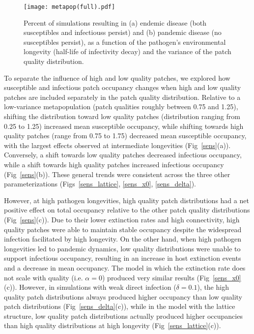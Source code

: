 \documentclass{svjour3}
\begin{document}
\begin{figure}
\centering
\texttt{[image: metapop(full).pdf]}
\caption{Percent of simulations resulting in (a) endemic disease (both susceptibles and infectiouss persist) and (b) pandemic disease (no susceptibles persist), as a function of the pathogen's environmental longevity (half-life of infectivity decay) and the variance of the patch quality distribution.}
\label{poutcome}
\end{figure}   

To separate the influence of high and low quality patches, we explored how susceptible and infectious patch occupancy changes when high and low quality patches are included separately in the patch quality distribution.  Relative to a low-variance metapopulation (patch qualities roughly between 0.75 and 1.25), shifting the distribution toward low quality patches (distribution ranging from 0.25 to 1.25) increased mean susceptible occupancy, while shifting towards high quality patches (range from 0.75 to 1.75) decreased mean susceptible occupancy, with the largest effects observed at intermediate longevities (Fig~\ref{sens}(a)).  Conversely, a shift towards low quality patches decreased infectious occupancy, while a shift towards high quality patches increased infectious occupancy (Fig~\ref{sens}(b)).  These general trends were consistent across the three other parameterizations (Figs~\ref{sens_lattice}, \ref{sens_x0}, \ref{sens_delta}).  

However, at high pathogen longevities, high quality patch distributions had a net positive effect on total occupancy relative to the other patch quality distributions (Fig~\ref{sens}(c)).  Due to their lower extinction rates and high connectivity, high quality patches were able to maintain stable occupancy despite the widespread infection facilitated by high longevity.  On the other hand, when high pathogen longevities led to pandemic dynamics, low quality distributions were unable to support infectious occupancy, resulting in an increase in host extinction events and a decrease in mean occupancy.  The model in which the extinction rate does not scale with quality (i.e. $\alpha = 0$) produced very similar results (Fig~\ref{sens_x0}(c)).  However, in simulations with weak direct infection ($\delta = 0.1$), the high quality patch distributions always produced higher occupancy than low quality patch distributions (Fig~\ref{sens_delta}(c)), while in the model with the lattice structure, low quality patch distributions actually produced higher occupancies than high quality distributions at high longevity (Fig~\ref{sens_lattice}(c)).
\end{document}
